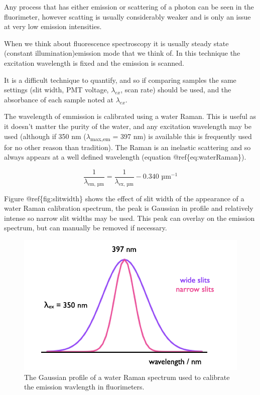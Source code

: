 \documentclass[
]{book}
\begin{document}
Any process that has either emission or scattering of a photon can be seen in the fluorimeter, however scatting is usually considerably weaker and is only an issue at very low emission intensities.

When we think about fluorescence spectroscopy it is usually steady state (constant illumination)emission mode that we think of. In this technique the excitation wavelength is fixed and the emission is scanned.

It is a difficult technique to quantify, and so if comparing samples the same settings (slit width, PMT voltage, \(\lambda_{ex}\), scan rate) should be used, and the absorbance of each sample noted at \(\lambda_{ex}\).

The wavelength of emmission is calibrated using a water Raman. This is useful as it doesn't matter the purity of the water, and any excitation wavelength may be used (although if 350 nm (\(\lambda\)\textsubscript{max,em} = 397 nm) is available this is frequently used for no other reason than tradition). The Raman is an inelastic scattering and so always appears at a well defined wavelength (equation @ref\{eq:waterRaman\}).

\begin{equation}
\frac{1}{\lambda_{\textrm{em, µm}}}=\frac{1}{\lambda_{\textrm{ex, µm}}}-0.340 \textrm{ µm}^{-1}
\label{eq:waterRaman}
\end{equation}

Figure @ref\{fig:slitwidth\} shows the effect of slit width of the appearance of a water Raman calibration spectrum, the peak is Gaussian in profile and relatively intense so narrow slit widths may be used. This peak can overlay on the emission spectrum, but can manually be removed if necessary.

\begin{figure}

{\centering \includegraphics[width=0.4\linewidth]{images/waterRaman} 

}

\caption{The Gaussian profile of a water Raman spectrum used to calibrate the emission wavlength in fluorimeters.}\label{fig:waterRaman}
\end{figure}
\end{document}
